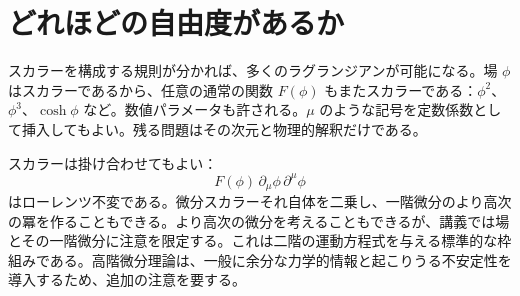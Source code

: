 \section{どれほどの自由度があるか}

スカラーを構成する規則が分かれば、多くのラグランジアンが可能になる。場 \(\phi\) はスカラーであるから、任意の通常の関数 \(F(\phi)\) もまたスカラーである：\(\phi^2\)、\(\phi^3\)、\(\cosh\phi\) など。数値パラメータも許される。\(\mu\) のような記号を定数係数として挿入してもよい。残る問題はその次元と物理的解釈だけである。

\begin{classroomqa}
\end{classroomqa}

スカラーは掛け合わせてもよい：
\begin{equation}
F(\phi)\,\partial_\mu\phi\,\partial^\mu\phi
\end{equation}
はローレンツ不変である。微分スカラーそれ自体を二乗し、一階微分のより高次の冪を作ることもできる。より高次の微分を考えることもできるが、講義では場とその一階微分に注意を限定する。これは二階の運動方程式を与える標準的な枠組みである。高階微分理論は、一般に余分な力学的情報と起こりうる不安定性を導入するため、追加の注意を要する。

\begin{classroomqa}
\end{classroomqa}

\begin{classroomqa}
\end{classroomqa}

